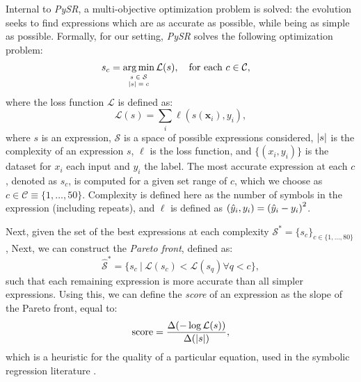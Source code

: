 \documentclass[nohyperref]{article}
\newcommand\pysr{\textit{PySR}\xspace}
\theoremstyle{plain}
\theoremstyle{definition}
\theoremstyle{remark}
\begin{document}
Internal to \pysr, a multi-objective optimization problem is solved: the evolution seeks to find expressions which are as accurate as possible, while being as simple as possible.
Formally, for our setting, \pysr solves the following optimization problem:
\begin{align}
    s_c &= 
        \mathop{\arg\min}_{
            \tiny
            \begin{array}{c}s\in\mathcal{S}\\ \abs{s} = c \end{array}
        }
        \mathcal{L}(s),
    \quad\text{for each } c\in \mathcal{C},\nonumber
\end{align}
where the loss function $\mathcal{L}$ is defined as:
\begin{equation}
\mathcal{L}(s) = \sum_i \ell(s(\mathbf{x}_i), y_i),
\end{equation}
where $s$ is an expression, 
$\mathcal{S}$ is a space of possible expressions considered,
$\abs{s}$ is the complexity of an expression $s$,
$\ell$ is the loss function, and $\{(x_i, y_i)\}$ is the dataset
for $x_i$ each input and $y_i$ the label.
The most accurate expression at each $c$, denoted as $s_c$, is computed for a given set range of $c$, which we choose as $c\in\mathcal{C}\equiv \{1, \ldots, 50\}$.
Complexity is defined here
as the number of symbols in the expression (including repeats),
and $\ell$ is defined as $(\hat{y}_i, y_i) = \qty(\hat{y}_i - y_i)^2$.

Next, given the set of the best expressions at each complexity $\mathcal{S}^\ast = \{s_c\}_{c\in\{1,\ldots,80\}}$,
Next, we can construct the \textit{Pareto front}, defined as:
\begin{equation}
    \hat{\mathcal{S}}^\ast = \{s_c \ |\ \mathcal{L}(s_c) < \mathcal{L}(s_q) \forall q < c \},
\end{equation}
such that each remaining expression is more accurate than all simpler expressions.
Using this, we can define the \textit{score} of an expression as the slope of the Pareto front, equal to:
\begin{equation}
    \text{score} = \frac{\Delta (-\log \mathcal{L}(s))}{\Delta(\abs{s})},
\end{equation}
which is a heuristic for the quality of a particular equation, used in the symbolic regression literature \citep[see, e.g.,][]{schmidtDistillingFreeFormNatural2009,cranmerDiscoveringSymbolicModels2020}.

\end{document}
